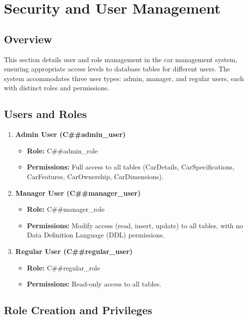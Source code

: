 \documentclass[12pt]{report}
\begin{document}
\chapter{Security and User Management}
\section{Overview}  
This section details user and role management in the car management system, ensuring appropriate access levels to database tables for different users. The system accommodates three user types: admin, manager, and regular users, each with distinct roles and permissions.  
\section{Users and Roles}  
\begin{enumerate}
   \item \textbf{Admin User (C\#\#admin\_user)}  
    \begin{itemize}  
        \item \textbf{Role:} C\#\#admin\_role  
        \item \textbf{Permissions:} Full access to all tables (CarDetails, CarSpecifications, CarFeatures, CarOwnership, CarDimensions).  
    \end{itemize}
    \item \textbf{Manager User (C\#\#manager\_user)}  
    \begin{itemize}  
        \item \textbf{Role:} C\#\#manager\_role  
        \item \textbf{Permissions:} Modify access (read, insert, update) to all tables, with no Data Definition Language (DDL) permissions.  
    \end{itemize}  
    
    \item \textbf{Regular User (C\#\#regular\_user)}  
    \begin{itemize}  
        \item \textbf{Role:} C\#\#regular\_role  
        \item \textbf{Permissions:} Read-only access to all tables.  
    \end{itemize}  
\end{enumerate}

\section{Role Creation and Privileges}  
\end{document}
